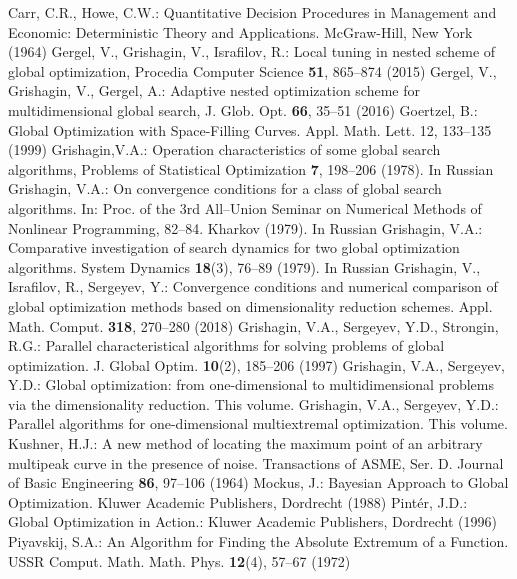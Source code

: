 % 
\begin{thebibliography}{99.}

	Carr, C.R., Howe, C.W.: Quantitative Decision Procedures in Management and Economic: Deterministic Theory and Applications. McGraw-Hill, New York (1964)
 Gergel, V.,  Grishagin, V., Israfilov, R.: Local tuning in nested scheme of global optimization, Procedia Computer Science \textbf{51}, 865--874 (2015) 
	Gergel, V., Grishagin, V., Gergel, A.: Adaptive nested optimization scheme for multidimensional global search, J. Glob. Opt. \textbf{66}, 35--51 (2016)
	Goertzel, B.: Global Optimization with Space-Filling Curves. Appl. Math. Lett. 12, 133--135 (1999)
  Grishagin,V.A.: Operation characteristics of some global search algorithms, Problems of Statistical Optimization \textbf{7},  198--206 (1978). In Russian
 Grishagin, V.A.: On convergence conditions for a class of global search algorithms. In: Proc. of the 3rd All–Union Seminar on Numerical Methods of Nonlinear Programming,  82–84. Kharkov (1979). In Russian
 Grishagin, V.A.: Comparative investigation of search dynamics for two global optimization algorithms. System Dynamics \textbf{18}(3), 76--89 (1979). In Russian
	Grishagin, V.,  Israfilov, R., Sergeyev, Y.: Convergence conditions and numerical comparison of global optimization methods based on dimensionality reduction schemes. Appl. Math.  Comput. \textbf{318}, 270--280 (2018)
 Grishagin, V.A., Sergeyev, Y.D., Strongin, R.G.: Parallel characteristical algorithms for solving problems of global optimization. J. Global Optim. \textbf{10}(2), 185--206 (1997)
 Grishagin, V.A., Sergeyev, Y.D.: Global optimization: from one-dimensional to multidimensional problems via the dimensionality reduction. This volume.
 Grishagin, V.A., Sergeyev, Y.D.: Parallel algorithms for one-dimensional multiextremal optimization. This volume.
	Kushner, H.J.: A new method of locating the maximum point of an arbitrary multipeak curve in the presence of noise. Transactions of ASME, Ser. D. Journal of Basic Engineering \textbf{86}, 97--106 (1964)
	Mockus, J.: Bayesian Approach to Global Optimization. Kluwer Academic Publishers, Dordrecht (1988)
	Pint{\'e}r, J.D.: Global Optimization in Action.: Kluwer Academic Publishers, Dordrecht (1996)
	Piyavskij, S.A.: An Algorithm for Finding the Absolute Extremum of a Function. USSR Comput. Math. Math. Phys. \textbf{12}(4), 57--67 (1972)

\end{thebibliography}
